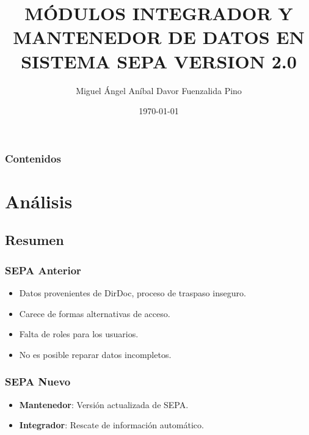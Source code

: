 \documentclass{beamer}
\title[SEPA 2.0]{MÓDULOS INTEGRADOR Y MANTENEDOR DE DATOS EN SISTEMA SEPA VERSION 2.0} %
\author{Miguel Ángel Aníbal Davor Fuenzalida Pino} %
\institute[UTEM] %
{
UNIVERSIDAD TECNOLÓGICA METROPOLITANA \\ %
\medskip
\textit{anibaldavor@gmail.com} %
}
\date{\today} %
\begin{document}
\begin{frame}
\titlepage %
\end{frame}

\begin{frame}
\frametitle{Contenidos} %
\tableofcontents %
\end{frame}


\section{Análisis}

\subsection{Resumen}

\begin{frame}
\frametitle{SEPA Anterior}
\begin{itemize}
\item Datos provenientes de DirDoc, proceso de traspaso inseguro.
\item Carece de formas alternativas de acceso.
\item Falta de roles para los usuarios.
\item No es posible reparar datos incompletos.
\end{itemize}
\end{frame}


\begin{frame}
\frametitle{SEPA Nuevo}
\begin{itemize}
\item \textbf{Mantenedor}: Versión actualizada de SEPA.
\item \textbf{Integrador}: Rescate de información automático.
\end{itemize}
\end{frame}
\end{document}
